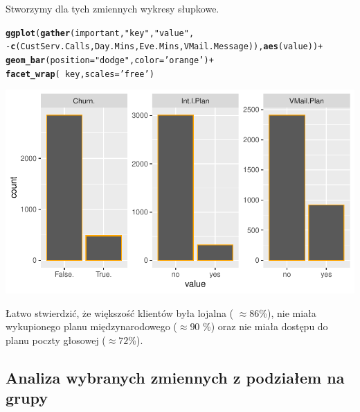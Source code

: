 \documentclass{article}\usepackage[]{graphicx}\usepackage[]{color}
\makeatletter
\def\maxwidth{ %
  \ifdim\Gin@nat@width>\linewidth
    \linewidth
  \else
    \Gin@nat@width
  \fi
}
\newcommand{\hlstr}[1]{\textcolor[rgb]{0.192,0.494,0.8}{#1}}%
\newcommand{\hlopt}[1]{\textcolor[rgb]{0,0,0}{#1}}%
\newcommand{\hlstd}[1]{\textcolor[rgb]{0.345,0.345,0.345}{#1}}%
\newcommand{\hlkwc}[1]{\textcolor[rgb]{0.333,0.667,0.333}{#1}}%
\newcommand{\hlkwd}[1]{\textcolor[rgb]{0.737,0.353,0.396}{\textbf{#1}}}%
\newenvironment{kframe}{%
 \def\at@end@of@kframe{}%
 \ifinner\ifhmode%
  \def\at@end@of@kframe{\end{minipage}}%
  \begin{minipage}{\columnwidth}%
 \fi\fi%
 \def\FrameCommand##1{\hskip\@totalleftmargin \hskip-\fboxsep
 \colorbox{shadecolor}{##1}\hskip-\fboxsep
     \hskip-\linewidth \hskip-\@totalleftmargin \hskip\columnwidth}%
 \MakeFramed {\advance\hsize-\width
   \@totalleftmargin\z@ \linewidth\hsize
   \@setminipage}}%
 {\par\unskip\endMakeFramed%
 \at@end@of@kframe}
\newenvironment{knitrout}{}{} %
\makeatother
\begin{document}
Stworzymy dla tych zmiennych wykresy słupkowe.
\begin{knitrout}
\color{fgcolor}\begin{kframe}
\begin{alltt}
\hlkwd{ggplot}\hlstd{(}\hlkwd{gather}\hlstd{(important,} \hlstr{"key"}\hlstd{,} \hlstr{"value"}\hlstd{,}
              \hlopt{-}\hlkwd{c}\hlstd{(CustServ.Calls, Day.Mins, Eve.Mins, VMail.Message)),} \hlkwd{aes}\hlstd{(value))} \hlopt{+}
  \hlkwd{geom_bar}\hlstd{(}\hlkwc{position}\hlstd{=}\hlstr{"dodge"}\hlstd{,} \hlkwc{color}\hlstd{=}\hlstr{'orange'}\hlstd{)} \hlopt{+}
  \hlkwd{facet_wrap}\hlstd{(}\hlopt{~}\hlstd{key,} \hlkwc{scales}\hlstd{=}\hlstr{'free'}\hlstd{)}
\end{alltt}
\end{kframe}

{\centering \includegraphics[width=\maxwidth]{figure/Wykresy_slupkowe_dla_wybranych_zmiennych-1} 

}



\end{knitrout}
Łatwo stwierdzić, że większość klientów była lojalna ( $\approx 86$\%), nie miała wykupionego planu międzynarodowego ($\approx 90$ \%) oraz nie miała dostępu do planu poczty głosowej ($\approx 72$\%).  

\subsection{Analiza wybranych zmiennych z podziałem na grupy}
\end{document}
